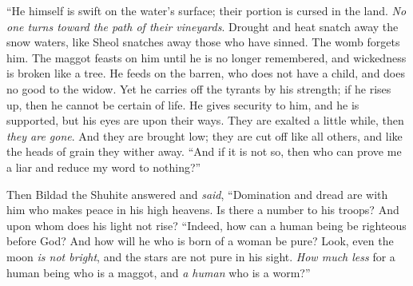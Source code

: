 \begin{biblechapter}
\verse “He himself is swift on the water’s surface; 
their portion is cursed in the land. 
\textit{No one turns toward the path of their vineyards}.
\verse Drought and heat snatch away the snow waters, 
like Sheol snatches away those who have sinned.
\verse The womb forgets him. 
The maggot feasts on him until he is no longer remembered, 
and wickedness is broken like a tree.
\verse He feeds on the barren, who does not have a child, 
and does no good to the widow.
\verse Yet he carries off the tyrants by his strength; 
if he rises up, then he cannot be certain of life.
\verse He gives security to him, and he is supported, 
but his eyes are upon their ways.
\verse They are exalted a little while, then \textit{they are gone}. 
And they are brought low; they are cut off like all others, 
and like the heads of grain they wither away.
\verse “And if it is not so, then who can prove me a liar 
and reduce my word to nothing?”
\end{biblechapter}

\begin{biblechapter} %
 Then Bildad the Shuhite answered and \textit{said},
\verse “Domination and dread are with him 
who makes peace in his high heavens.
\verse Is there a number to his troops? 
And upon whom does his light not rise?
\verse “Indeed, how can a human being be righteous before God? 
And how will he who is born of a woman be pure?
\verse Look, even the moon \textit{is not bright}, 
and the stars are not pure in his sight.
\verse \textit{How much less} for a human being who is a maggot, 
and \textit{a human} who is a worm?”
\end{biblechapter}

